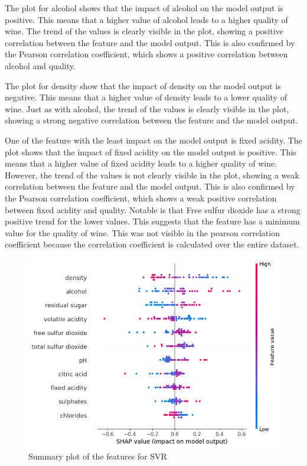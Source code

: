\documentclass{article}
\begin{document}
The plot for alcohol shows that the impact of alcohol on the model output is positive.
This means that a higher value of alcohol leads to a higher quality of wine.
The trend of the values is clearly visible in the plot, showing a positive correlation between the feature and the model output.
This is also confirmed by the Pearson correlation coefficient, which shows a positive correlation between alcohol and quality.

The plot for density show that the impact of density on the model output is negative.
This means that a higher value of density leads to a lower quality of wine.
Just as with alcohol, the trend of the values is clearly visible in the plot, showing a strong negative correlation between the feature and the model output.

One of the feature with the least impact on the model output is fixed acidity.
The plot shows that the impact of fixed acidity on the model output is positive.
This means that a higher value of fixed acidity leads to a higher quality of wine.
However, the trend of the values is not clearly visible in the plot, showing a weak correlation between the feature and the model output.
This is also confirmed by the Pearson correlation coefficient, which shows a weak positive correlation between fixed acidity and quality.
Notable is that Free sulfur dioxide has a strong positive trend for the lower values. This suggests that the feature has a minimum value for the quality of wine.
This was not visible in the pearson correlation coefficient because the correlation coefficient is calculated over the entire dataset.

\begin{figure}
	\centering
	\includegraphics[width=\linewidth]{figures/shap-summary-svr.png}
	\caption{Summary plot of the features for SVR}
	\label{fig:summary-plot-svr}
\end{figure}
\end{document}
